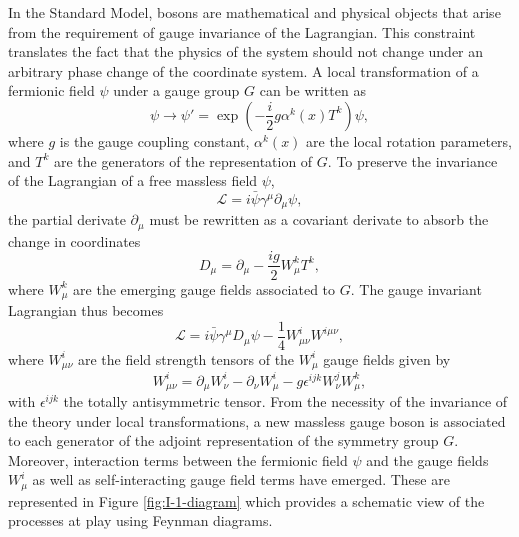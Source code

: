     In the Standard Model, bosons are mathematical and physical objects that arise from the requirement of gauge invariance of the Lagrangian. This constraint translates the fact that the physics of the system should not change under an arbitrary phase change of the coordinate system. A local transformation of a fermionic field $ \psi $ under a gauge group $ G $  can be written as
    \begin{equation}
      \psi \rightarrow \psi' = \exp\left(- \frac{i}{2} g \alpha^k(x) T^k \right) \psi ,
    \end{equation}
    where $ g $ is the gauge coupling constant, $ \alpha^k(x) $ are the local rotation parameters, and $ T^k $ are the generators of the representation of $ G $. To preserve the invariance of the Lagrangian of a free massless field $ \psi $,
    \begin{equation}
      \mathcal{L} = i \bar{\psi} \gamma^\mu \partial_\mu \psi ,
    \end{equation}
    the partial derivate $ \partial_\mu $ must be rewritten as a covariant derivate to absorb the change in coordinates
    \begin{equation}
      D_\mu = \partial_\mu - \frac{i g}{2} W^k_\mu T^k ,
    \end{equation}
    where $ W^k_\mu $ are the emerging gauge fields associated to $ G $. The gauge invariant Lagrangian thus becomes
    \begin{equation}
      \mathcal{L} = i \bar{\psi} \gamma^\mu D_\mu \psi - \frac{1}{4} W^i_{\mu \nu} W^{i \mu \nu} ,
    \end{equation}
    where $ W^i_{\mu \nu} $ are the field strength tensors of the $ W^i_\mu $ gauge fields given by
    \begin{equation}
      W^i_{\mu \nu} = \partial_\mu W^i_\nu - \partial_\nu W^i_\mu - g \epsilon^{ijk} W^j_\nu W^k_\mu ,
    \end{equation}
    with $ \epsilon^{ijk} $ the totally antisymmetric tensor. From the necessity of the invariance of the theory under local transformations, a new massless gauge boson is associated to each generator of the adjoint representation of the symmetry group $ G $. Moreover, interaction terms between the fermionic field $ \psi $ and the gauge fields $ W^i_\mu $ as well as self-interacting gauge field terms have emerged. These are represented in Figure \ref{fig:I-1-diagram} which provides a schematic view of the processes at play using Feynman diagrams.


